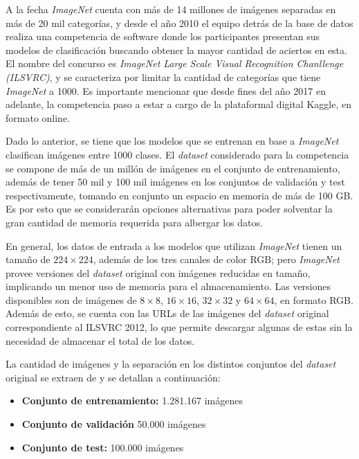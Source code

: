 \documentclass[conference]{IEEEtran}
\begin{document}
A la fecha \textit{ImageNet} cuenta con más de 14 millones de imágenes separadas en más de 20 mil categorías, y desde el año 2010 el equipo detrás de la base de datos realiza una competencia de software donde los participantes presentan sus modelos de clasificación buscando obtener la mayor cantidad de aciertos en esta. El nombre del concurso es \textit{ImageNet Large Scale Visual Recognition Chanllenge (ILSVRC)}, y se caracteriza por limitar la cantidad de categorías que tiene \textit{ImageNet} a 1000. Es importante mencionar que desde fines del año 2017 en adelante, la competencia paso a estar a cargo de la plataformal digital Kaggle, en formato online.

Dado lo anterior, se tiene que los modelos que se entrenan en base a \textit{ImageNet} clasifican imágenes entre 1000 clases. El \textit{dataset} considerado para la competencia se compone de más de un millón de imágenes en el conjunto de entrenamiento, además de tener 50 mil y 100 mil imágenes en los conjuntos de validación y test respectivamente, tomando en conjunto un espacio en memoria de más de 100 GB. Es por esto que se considerarán opciones alternativas para poder solventar la gran cantidad de memoria requerida para albergar los datos.

En general, los datos de entrada a los modelos que utilizan \textit{ImageNet} tienen un tamaño de $224 \times 224$, además de los tres canales de color RGB; pero \textit{ImageNet} provee versiones del \textit{dataset} original con imágenes reducidas en tamaño, implicando un menor uso de memoria para el almacenamiento. Las versiones disponibles son de imágenes de $8\times8$, $16\times16$, $32\times32$ y $64\times64$, en formato RGB. Además de esto, se cuenta con las URLs de las imágenes del \textit{dataset} original correspondiente al ILSVRC 2012, lo que permite descargar algunas de estas sin la necesidad de almacenar el total de los datos.

La cantidad de imágenes y la separación en los distintos conjuntos del \textit{dataset} original se extraen de \cite{imagenet} y se detallan a continuación:

\begin{itemize}
    \item \textbf{Conjunto de entrenamiento:}  1.281.167 imágenes
    \item \textbf{Conjunto de validación} 50.000 imágenes
    \item \textbf{Conjunto de test:} 100.000 imágenes
\end{itemize}
\end{document}
